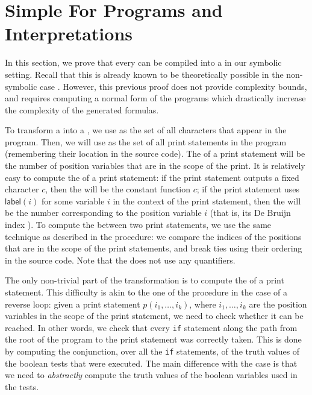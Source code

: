\section{Simple For Programs and Interpretations}
\label{sec:low-level}



In this section, we prove that every  can be compiled
into a  in our symbolic setting. Recall that
this is already known to be theoretically possible in the non-symbolic case
\cite{bojanczyk2018polyregular}. However, this previous proof does not provide
complexity bounds, and requires computing a normal form of the programs
 which drastically increase the complexity of the
generated formulas.

To transform a  into a ,
we use as  the set of all
characters that appear in the program. Then, we will use as  the set of all print statements in the program (remembering their
location in the source code). The  of a print statement will be the
number of position variables that are in the scope of the print. It is
relatively easy to compute the  of a print statement: if
the print statement outputs a fixed character $c$, then the  will be the constant function $c$; if the print statement uses
$\mathsf{label}(i)$ for some variable $i$ in the context of the print
statement, then the  will be the number corresponding to
the position variable $i$ (that is, its De Bruijn index \cite{DEBRUJ72}). To
compute the  between two print statements, we use the same
technique as described in the  procedure: we compare the
indices of the positions that are in the scope of the print statements, and
break ties using their ordering in the source code. Note that the  does not use any quantifiers.

The only non-trivial part of the transformation is to compute the  of a print statement. This difficulty is akin to the one of the
 procedure in the case of a reverse loop: given a print
statement $p(i_1, \dots, i_k)$, where $i_1, \dots, i_k$ are the position
variables in the scope of the print statement, we need to check whether it can
be reached. In other words, we check that every \texttt{if} statement along the
path from the root of the program to the print statement was correctly taken.
This is done by computing the conjunction, over all the \texttt{if} statements,
of the truth values of the boolean tests that were executed. The main
difference with the  case is that we need to
\emph{abstractly} compute the truth values of the boolean variables used in the
tests.

